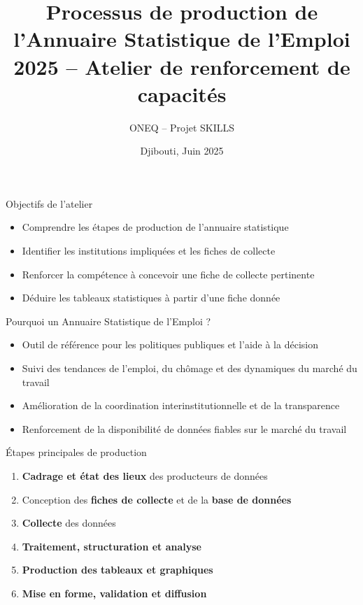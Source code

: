 \documentclass{beamer}
\title[Annuaire Statistique de l'Emploi]{Processus de production de l'Annuaire Statistique de l'Emploi 2025 -- Atelier de renforcement de capacit\'es}
\author{ONEQ -- Projet SKILLS}
\date{Djibouti, Juin 2025}
\begin{document}
\frame{\titlepage}

\begin{frame}{Objectifs de l'atelier}
\begin{itemize}
  \item Comprendre les \'etapes de production de l'annuaire statistique
  \item Identifier les institutions impliqu\'ees et les fiches de collecte
  \item Renforcer la comp\'etence \`a concevoir une fiche de collecte pertinente
  \item D\'eduire les tableaux statistiques \`a partir d'une fiche donn\'ee
\end{itemize}
\end{frame}

\begin{frame}{Pourquoi un Annuaire Statistique de l’Emploi ?}
\begin{itemize}
  \item Outil de r\'ef\'erence pour les politiques publiques et l’aide \`a la d\'ecision
  \item Suivi des tendances de l’emploi, du ch\^omage et des dynamiques du march\'e du travail
  \item Am\'elioration de la coordination interinstitutionnelle et de la transparence
  \item Renforcement de la disponibilit\'e de donn\'ees fiables sur le march\'e du travail
\end{itemize}
\end{frame}

\begin{frame}{\'Etapes principales de production}
\begin{enumerate}
  \item \textbf{Cadrage et \'etat des lieux} des producteurs de donn\'ees
  \item Conception des \textbf{fiches de collecte} et de la \textbf{base de donn\'ees}
  \item \textbf{Collecte} des donn\'ees
  \item \textbf{Traitement, structuration et analyse}
  \item \textbf{Production des tableaux et graphiques}
  \item \textbf{Mise en forme, validation et diffusion}
\end{enumerate}
\end{frame}
\end{document}
